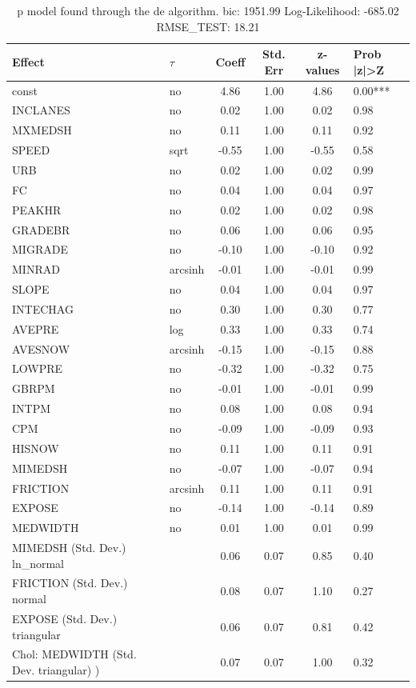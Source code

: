 \begin{table}
	\caption{p model found through the de algorithm. bic: 1951.99 Log-Likelihood: -685.02 RMSE_TEST: 18.21}
	\begin{center}
		\begin{tabular}{|l|l|c|c|c|l|}
			\hline
			Effect & $\tau$ & Coeff & Std. Err & z-values & Prob |z|>Z \\
			\hline
			const & no & 4.86 & 1.00 & 4.86 & 0.00*** \\
			\hline
			INCLANES & no & 0.02 & 1.00 & 0.02 & 0.98 \\
			\hline
			MXMEDSH & no & 0.11 & 1.00 & 0.11 & 0.92 \\
			\hline
			SPEED & sqrt & -0.55 & 1.00 & -0.55 & 0.58 \\
			\hline
			URB & no & 0.02 & 1.00 & 0.02 & 0.99 \\
			\hline
			FC & no & 0.04 & 1.00 & 0.04 & 0.97 \\
			\hline
			PEAKHR & no & 0.02 & 1.00 & 0.02 & 0.98 \\
			\hline
			GRADEBR & no & 0.06 & 1.00 & 0.06 & 0.95 \\
			\hline
			MIGRADE & no & -0.10 & 1.00 & -0.10 & 0.92 \\
			\hline
			MINRAD & arcsinh & -0.01 & 1.00 & -0.01 & 0.99 \\
			\hline
			SLOPE & no & 0.04 & 1.00 & 0.04 & 0.97 \\
			\hline
			INTECHAG & no & 0.30 & 1.00 & 0.30 & 0.77 \\
			\hline
			AVEPRE & log & 0.33 & 1.00 & 0.33 & 0.74 \\
			\hline
			AVESNOW & arcsinh & -0.15 & 1.00 & -0.15 & 0.88 \\
			\hline
			LOWPRE & no & -0.32 & 1.00 & -0.32 & 0.75 \\
			\hline
			GBRPM & no & -0.01 & 1.00 & -0.01 & 0.99 \\
			\hline
			INTPM & no & 0.08 & 1.00 & 0.08 & 0.94 \\
			\hline
			CPM & no & -0.09 & 1.00 & -0.09 & 0.93 \\
			\hline
			HISNOW & no & 0.11 & 1.00 & 0.11 & 0.91 \\
			\hline
			MIMEDSH & no & -0.07 & 1.00 & -0.07 & 0.94 \\
			\hline
			FRICTION & arcsinh & 0.11 & 1.00 & 0.11 & 0.91 \\
			\hline
			EXPOSE & no & -0.14 & 1.00 & -0.14 & 0.89 \\
			\hline
			MEDWIDTH & no & 0.01 & 1.00 & 0.01 & 0.99 \\
			\hline
			MIMEDSH (Std. Dev.) ln_normal &  & 0.06 & 0.07 & 0.85 & 0.40 \\
			\hline
			FRICTION (Std. Dev.) normal &  & 0.08 & 0.07 & 1.10 & 0.27 \\
			\hline
			EXPOSE (Std. Dev.) triangular &  & 0.06 & 0.07 & 0.81 & 0.42 \\
			\hline
			 Chol: MEDWIDTH (Std. Dev. triangular) ) &  & 0.07 & 0.07 & 1.00 & 0.32 \\
			\hline
		\end{tabular}
	\end{center}
\end{table}